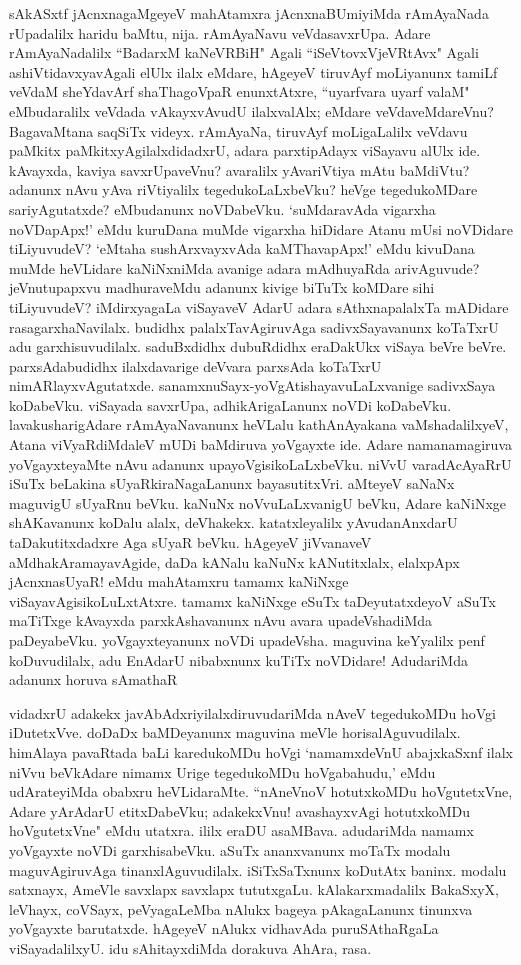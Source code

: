 sAkASxtf jAcnxnagaMgeyeV mahAtamxra jAcnxnaBUmiyiMda rAmAyaNada rUpadalilx haridu baMtu, nija. rAmAyaNavu veVdasavxrUpa. Adare rAmAyaNadalilx ``BadarxM kaNeVRBiH" Agali ``iSeVtovxVjeVRtAvx" Agali ashiVtidavxyavAgali elUlx ilalx eMdare, hAgeyeV tiruvAyf moLiyanunx tamiLf veVdaM sheYdavArf shaThagoVpaR enunxtAtxre, ``uyarfvara uyarf valaM" eMbudaralilx veVdada vAkayxvAvudU ilalxvalAlx; eMdare veVdaveMdareVnu? BagavaMtana saqSiTx videyx. rAmAyaNa, tiruvAyf moLigaLalilx veVdavu paMkitx paMkitxyAgilalxdidadxrU, adara parxtipAdayx viSayavu alUlx ide. kAvayxda, kaviya savxrUpaveVnu? avaralilx yAvariVtiya mAtu baMdiVtu? adanunx nAvu yAva riVtiyalilx tegedukoLaLxbeVku? heVge tegedukoMDare sariyAgutatxde? eMbudanunx noVDabeVku. `suMdaravAda vigarxha noVDapApx!' eMdu kuruDana muMde vigarxha hiDidare Atanu mUsi noVDidare tiLiyuvudeV? `eMtaha sushArxvayxvAda kaMThavapApx!' eMdu kivuDana muMde heVLidare kaNiNxniMda avanige adara mAdhuyaRda arivAguvude? jeVnutupapxvu madhuraveMdu adanunx kivige biTuTx koMDare sihi tiLiyuvudeV? iMdirxyagaLa viSayaveV AdarU adara sAthxnapalalxTa mADidare rasagarxhaNavilalx. budidhx palalxTavAgiruvAga sadivxSayavanunx koTaTxrU adu garxhisuvudilalx. saduBxdidhx dubuRdidhx eraDakUkx viSaya beVre beVre. parxsAdabudidhx ilalxdavarige deVvara parxsAda koTaTxrU nimARlayxvAgutatxde. sanamxnuSayx-yoVgAtishayavuLaLxvanige sadivxSaya koDabeVku. viSayada savxrUpa, adhikArigaLanunx noVDi koDabeVku. lavakusharigAdare rAmAyaNavanunx heVLalu kathAnAyakana vaMshadalilxyeV, Atana viVyaRdiMdaleV mUDi baMdiruva yoVgayxte ide. Adare namanamagiruva yoVgayxteyaMte nAvu adanunx upayoVgisikoLaLxbeVku. niVvU varadAcAyaRrU iSuTx beLakina sUyaRkiraNagaLanunx bayasutitxVri. aMteyeV saNaNx maguvigU sUyaRnu beVku. kaNuNx noVvuLaLxvanigU beVku, Adare kaNiNxge shAKavanunx koDalu alalx, deVhakekx. katatxleyalilx yAvudanAnxdarU taDakutitxdadxre Aga sUyaR beVku. hAgeyeV jiVvanaveV aMdhakAramayavAgide, daDa kANalu kaNuNx kANutitxlalx, elalxpApx jAcnxnasUyaR! eMdu mahAtamxru tamamx kaNiNxge viSayavAgisikoLuLxtAtxre. tamamx kaNiNxge eSuTx taDeyutatxdeyoV aSuTx maTiTxge kAvayxda parxkAshavanunx nAvu avara upadeVshadiMda paDeyabeVku. yoVgayxteyanunx noVDi upadeVsha. maguvina keYyalilx penf koDuvudilalx, adu EnAdarU nibabxnunx kuTiTx noVDidare! AdudariMda adanunx horuva sAmathaR


vidadxrU adakekx javAbAdxriyilalxdiruvudariMda nAveV tegedukoMDu hoVgi iDutetxVve. doDaDx baMDeyanunx maguvina meVle horisalAguvudilalx. himAlaya pavaRtada baLi karedukoMDu hoVgi `namamxdeVnU abajxkaSxnf {} ilalx niVvu beVkAdare nimamx Urige tegedukoMDu hoVgabahudu,' eMdu udArateyiMda obabxru heVLidaraMte. ``nAneVnoV hotutxkoMDu hoVgutetxVne, Adare yArAdarU etitxDabeVku; adakekxVnu! avashayxvAgi hotutxkoMDu hoVgutetxVne" eMdu utatxra. ililx eraDU asaMBava. adudariMda namamx yoVgayxte noVDi garxhisabeVku. aSuTx ananxvanunx moTaTx modalu maguvAgiruvAga tinanxlAguvudilalx. iSiTxSaTxnunx koDutAtx baninx. modalu satxnayx, AmeVle savxlapx savxlapx tututxgaLu. kAlakarxmadalilx BakaSxyX, leVhayx, coVSayx, peVyagaLeMba nAlukx bageya pAkagaLanunx tinunxva yoVgayxte barutatxde. hAgeyeV nAlukx vidhavAda puruSAthaRgaLa viSayadalilxyU. idu sAhitayxdiMda dorakuva AhAra, rasa. 


